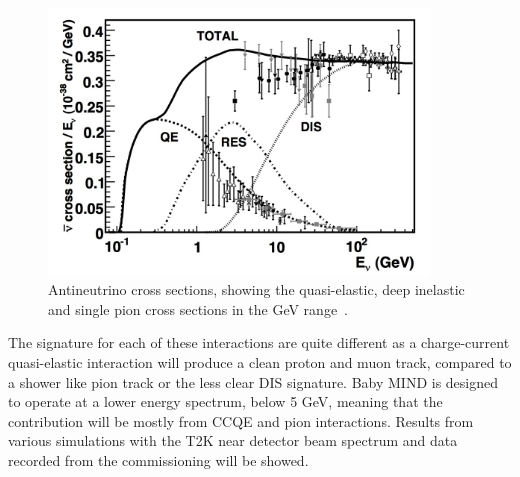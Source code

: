 \begin{figure}[h!]
\centering
\includegraphics[width=0.9\textwidth]{figures/antineutrinototal.jpeg}
\caption{Antineutrino cross sections, showing the quasi-elastic, deep inelastic and single pion cross sections in the GeV range~\cite{109Formaggio}.}
\label{fig:antineutrinoInteractionsFig}
\end{figure}

The signature for each of these interactions are quite different as a charge-current quasi-elastic interaction will produce a clean proton and muon track, compared to a shower like pion track or the less clear DIS signature. Baby MIND is designed to operate at a lower energy spectrum, below 5 GeV, meaning that the contribution will be mostly from CCQE and pion interactions. Results from various simulations with the T2K near detector beam spectrum and data recorded from the commissioning will be showed.



